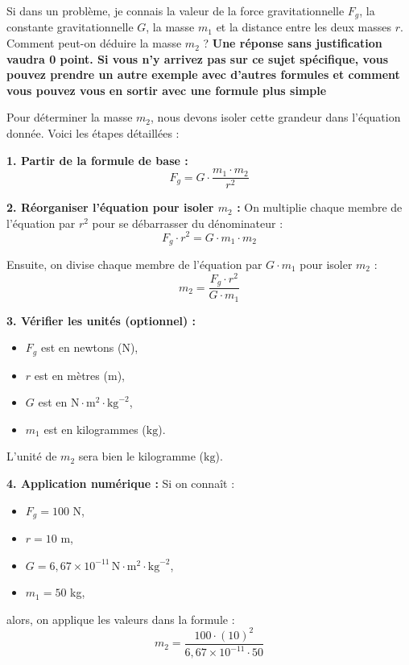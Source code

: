 \documentclass[answers]{exam}
\begin{document}
  \begin{questions}
    \question[3] Si dans un problème, je connais la valeur de la force gravitationnelle $F_g$, la constante gravitationnelle $G$, la masse $m_1$ et la distance entre les deux masses $r$. Comment peut-on déduire la masse $m_2$ ? \textbf{Une réponse sans justification vaudra 0 point. Si vous n'y arrivez pas sur ce sujet spécifique, vous pouvez prendre un autre exemple avec d'autres formules et comment vous pouvez vous en sortir avec une formule plus simple}
  
    \begin{solution}
      Pour déterminer la masse $m_2$, nous devons isoler cette grandeur dans l'équation donnée. Voici les étapes détaillées :
      
      \textbf{1. Partir de la formule de base :}
      \[
      F_g = G \cdot \frac{m_1 \cdot m_2}{r^2}
      \]
  
      \textbf{2. Réorganiser l'équation pour isoler $m_2$ :}
      On multiplie chaque membre de l'équation par $r^2$ pour se débarrasser du dénominateur :
      \[
      F_g \cdot r^2 = G \cdot m_1 \cdot m_2
      \]
  
      Ensuite, on divise chaque membre de l'équation par $G \cdot m_1$ pour isoler $m_2$ :
      \[
      m_2 = \frac{F_g \cdot r^2}{G \cdot m_1}
      \]
  
      \textbf{3. Vérifier les unités (optionnel) :}
      \begin{itemize}[noitemsep]
          \item $F_g$ est en newtons ($\text{N}$),
          \item $r$ est en mètres ($\text{m}$),
          \item $G$ est en $\text{N} \cdot \text{m}^2 \cdot \text{kg}^{-2}$,
          \item $m_1$ est en kilogrammes ($\text{kg}$).
      \end{itemize}
  
      L'unité de $m_2$ sera bien le kilogramme ($\text{kg}$).
  
      \textbf{4. Application numérique :}
      Si on connaît :
      \begin{itemize}[noitemsep]
          \item $F_g = 100$ N,
          \item $r = 10$ m,
          \item $G = 6,67 \times 10^{-11} \, \text{N} \cdot \text{m}^2 \cdot \text{kg}^{-2}$,
          \item $m_1 = 50$ kg,
      \end{itemize}
      alors, on applique les valeurs dans la formule :
      \[
      m_2 = \frac{100 \cdot (10)^2}{6,67 \times 10^{-11} \cdot 50}
      \]
  

\end{solution}
\end{questions}
\end{document}
